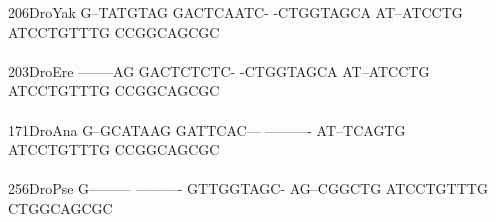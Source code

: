 \documentclass[11pt,twoside,reqno,a4paper]{article}
\begin{document}
{206\hspace*{1\charwidth}DroYak	G--TATGTAG	GACTCAATC-	-CTGGTAGCA	AT--ATCCTG	ATCCTGTTTG	CCGGCAGCGC	\\
\hspace*{4\charwidth}\hspace*{7\charwidth}\hspace*{1\charwidth}\hspace*{1\charwidth}\hspace*{1\charwidth}\hspace*{1\charwidth}\hspace*{1\charwidth}\hspace*{1\charwidth}\\
203\hspace*{1\charwidth}DroEre	--------AG	GACTCTCTC-	-CTGGTAGCA	AT--ATCCTG	ATCCTGTTTG	CCGGCAGCGC	\\
\hspace*{4\charwidth}\hspace*{7\charwidth}\hspace*{1\charwidth}\hspace*{1\charwidth}\hspace*{1\charwidth}\hspace*{1\charwidth}\hspace*{1\charwidth}\hspace*{1\charwidth}\\
171\hspace*{1\charwidth}DroAna	G--GCATAAG	GATTCAC---	----------	AT--TCAGTG	ATCCTGTTTG	CCGGCAGCGC	\\
\hspace*{4\charwidth}\hspace*{7\charwidth}\hspace*{1\charwidth}\hspace*{1\charwidth}\hspace*{1\charwidth}\hspace*{1\charwidth}\hspace*{1\charwidth}\hspace*{1\charwidth}\\
256\hspace*{1\charwidth}DroPse	G---------	----------	GTTGGTAGC-	AG--CGGCTG	ATCCTGTTTG	CTGGCAGCGC	\\
\hspace*{4\charwidth}\hspace*{7\charwidth}\hspace*{1\charwidth}\hspace*{1\charwidth}\hspace*{1\charwidth}\hspace*{1\charwidth}\hspace*{1\charwidth}\hspace*{1\charwidth}\\
}
\end{document}
